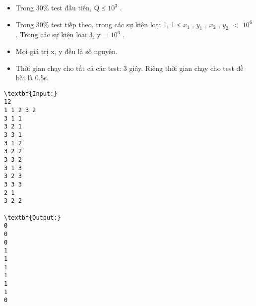 \begin{itemize}
	\item Trong 30\% test đầu tiên, Q ≤ $10^{3}$ .
	\item Trong 30\% test tiếp theo, trong các sự kiện loại 1, 1 ≤ $x_{1}$ , $y_{1}$ , $x_{2}$ , $y_{2}$ $<$ $10^{6}$ . Trong các sự kiện loại 3, y = $10^{6}$ .
	\item Mọi giá trị x, y đều là số nguyên.
	\item Thời gian chạy cho tất cả các test: 3 giây. Riêng thời gian chạy cho test đề bài là 0.5s.
\end{itemize}
\begin{verbatim}
\textbf{Input:}
12
1 1 2 3 2
3 1 1
3 2 1
3 3 1
3 1 2
3 2 2
3 3 2
3 1 3
3 2 3
3 3 3
2 1
3 2 2

\textbf{Output:}
0
0
0
1
1
1
1
1
1
0
\end{verbatim}